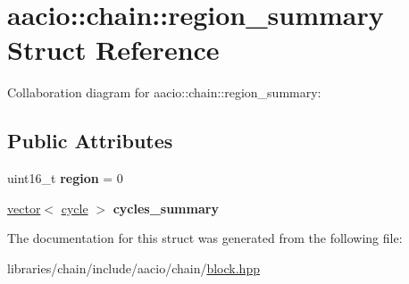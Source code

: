 \hypertarget{structaacio_1_1chain_1_1region__summary}{}\section{aacio\+:\+:chain\+:\+:region\+\_\+summary Struct Reference}
\label{structaacio_1_1chain_1_1region__summary}


Collaboration diagram for aacio\+:\+:chain\+:\+:region\+\_\+summary\+:
\subsection*{Public Attributes}
\begin{DoxyCompactItemize}
\item 
\mbox{\label{structaacio_1_1chain_1_1region__summary_a875db10b072b182dfcc6ad52c1a1ba6f}} 
uint16\+\_\+t {\bfseries region} = 0
\item 
\mbox{\label{structaacio_1_1chain_1_1region__summary_a76bd8b345174f0741992dda444c2d4aa}} 
\mbox{\hyperlink{classstd_1_1vector}{vector}}$<$ \mbox{\hyperlink{classstd_1_1vector}{cycle}} $>$ {\bfseries cycles\+\_\+summary}
\end{DoxyCompactItemize}


The documentation for this struct was generated from the following file\+:\begin{DoxyCompactItemize}
\item 
libraries/chain/include/aacio/chain/\mbox{\hyperlink{block_8hpp}{block.\+hpp}}\end{DoxyCompactItemize}
